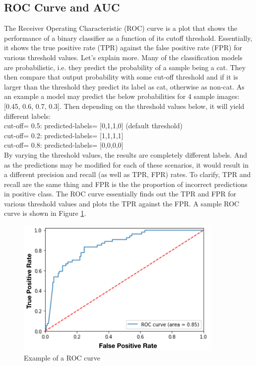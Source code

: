 \documentclass[11pt, a4paper]{article}
\begin{document}
\subsection{ROC Curve and AUC}
The Receiver Operating Characteristic (ROC) curve is a plot that shows the performance of a binary classifier as a function of its cutoff threshold. Essentially, it shows the true positive rate (TPR) against the false positive rate (FPR) for various threshold values. Let's explain more.
Many of the classification models are probabilistic, i.e. they predict the probability of a sample being a cat. They then compare that output probability with some cut-off threshold and if it is larger than the threshold they predict its label as cat, otherwise as non-cat. As an example a model may predict the below probabilities for 4 sample images: [0.45, 0.6, 0.7, 0.3]. Then depending on the threshold values below, it will yield different labels:\\
cut-off= 0.5: predicted-labels= [0,1,1,0] (default threshold)\\
cut-off= 0.2: predicted-labels= [1,1,1,1]\\
cut-off= 0.8: predicted-labels= [0,0,0,0]\\
By varying the threshold values, the results are completely different labels. And as the predictions may be modified for each of these scenarios, it would result in a different precision and recall (as well as TPR, FPR) rates. To clarify, TPR and recall are the same thing and FPR is the the proportion of incorrect predictions in positive class. The ROC curve essentially finds out the TPR and FPR for various threshold values and plots the TPR against the FPR. A sample ROC curve is shown in Figure \ref{fig:Sample_ROC_curve}.
\begin{figure}[H]
	\centering
	\includegraphics[width=10cm]{imgs/general/Sample_ROC_curve.png}
	\caption{Example of a ROC curve}
	 \label{fig:Sample_ROC_curve}
\end{figure}
\end{document}
